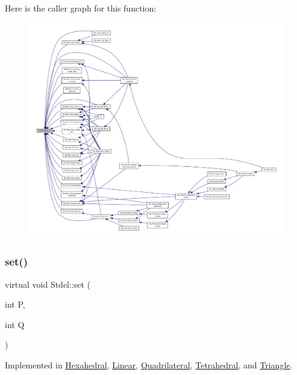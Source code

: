 Here is the caller graph for this function\+:
\nopagebreak
\begin{figure}[H]
\begin{center}
\leavevmode
\includegraphics[width=350pt]{classStdel_a457d20e34fb7a32eb1e4aca6c19f53a2_icgraph}
\end{center}
\end{figure}
\mbox{\label{classStdel_ab42c46493ab17be6f2642a558fea8a05}} 
\subsubsection{\texorpdfstring{set()}{set()}}
{\footnotesize\ttfamily virtual void Stdel\+::set (\begin{DoxyParamCaption}\item[{int}]{P,  }\item[{int}]{Q }\end{DoxyParamCaption})\hspace{0.3cm}{\ttfamily [pure virtual]}}



Implemented in \hyperlink{classHexahedral_aed81c3a2149b36e9bdc0dd67bc5f3bdc}{Hexahedral}, \hyperlink{classLinear_a5cd90cf088a548e3440c905c063d9d6f}{Linear}, \hyperlink{classQuadrilateral_a369e691d1ae71d00f9474078d176f032}{Quadrilateral}, \hyperlink{classTetrahedral_a05fc469d2a88e8a08a0a64621883d021}{Tetrahedral}, and \hyperlink{classTriangle_a51d0da1119ccde5c695ea4da980bda8d}{Triangle}.


